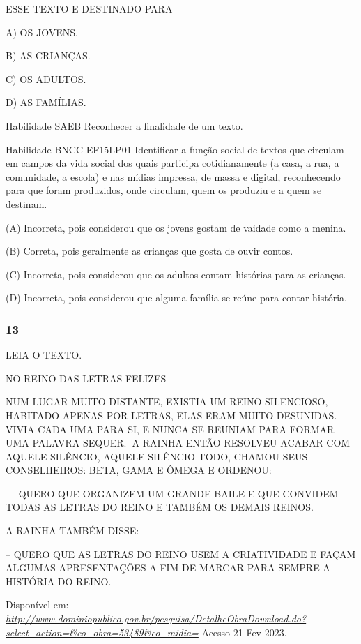 \begin{escola}
ESSE TEXTO E DESTINADO PARA

A) OS JOVENS.

B) AS CRIANÇAS.

C) OS ADULTOS.

D) AS FAMÍLIAS.

Habilidade SAEB Reconhecer a finalidade de um texto.

Habilidade BNCC EF15LP01 Identificar a função social de textos que
circulam em campos da vida social dos quais participa cotidianamente (a
casa, a rua, a comunidade, a escola) e nas mídias impressa, de massa e
digital, reconhecendo para que foram produzidos, onde circulam, quem os
produziu e a quem se destinam.

(A) Incorreta, pois considerou que os jovens gostam de vaidade como a
menina.

(B) Correta, pois geralmente as crianças que gosta de ouvir contos.

(C) Incorreta, pois considerou que os adultos contam histórias para as
crianças.

(D) Incorreta, pois considerou que alguma família se reúne para contar
história.

\subsubsection{13}\label{section-85}

LEIA O TEXTO.

NO REINO DAS LETRAS FELIZES

NUM LUGAR MUITO DISTANTE, EXISTIA UM REINO SILENCIOSO, HABITADO APENAS
POR LETRAS, ELAS ERAM MUITO DESUNIDAS. VIVIA CADA UMA PARA SI, E NUNCA
SE REUNIAM PARA FORMAR UMA PALAVRA SEQUER.\textbf{~}A RAINHA ENTÃO
RESOLVEU ACABAR COM AQUELE SILÊNCIO, AQUELE SILÊNCIO TODO, CHAMOU SEUS
CONSELHEIROS: BETA, GAMA E ÔMEGA E ORDENOU:

~-- QUERO QUE ORGANIZEM UM GRANDE BAILE E QUE CONVIDEM TODAS AS LETRAS
DO REINO E TAMBÉM OS DEMAIS REINOS.

A RAINHA TAMBÉM DISSE:

-- QUERO QUE AS LETRAS DO REINO USEM A CRIATIVIDADE E FAÇAM ALGUMAS
APRESENTAÇÕES A FIM DE MARCAR PARA SEMPRE A HISTÓRIA DO REINO.

Disponível em:
\href{http://www.dominiopublico.gov.br/pesquisa/DetalheObraDownload.do?select_action=\&co_obra=53489\&co_midia=}{\emph{http://www.dominiopublico.gov.br/pesquisa/DetalheObraDownload.do?select\_action=\&co\_obra=53489\&co\_midia=}}
Acesso 21 Fev 2023.


\end{escola}
